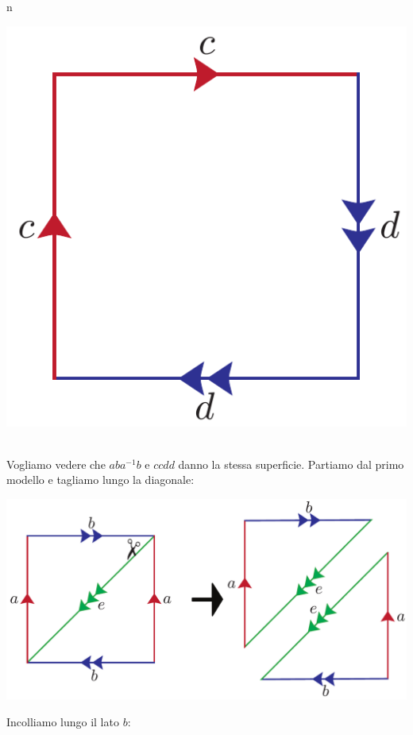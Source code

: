 \begin{remark}{n}
\begin{minipage}{.24\linewidth}
\begin{center}
		\includegraphics[trim=0cm 0cm 0cm 0cm, clip, scale=0.3]{images/projdouble.pdf}
	\end{center}
\end{minipage}\\
Vogliamo vedere che $aba^{-1}b$ e $ccdd$ danno la stessa superficie. Partiamo dal primo modello e tagliamo lungo la diagonale:
\begin{center}
	\includegraphics[trim=0cm 0cm 0cm 0cm, clip, scale=0.3]{images/kleintoprojdouble1.pdf}
\end{center}
Incolliamo lungo il lato $b$:
\begin{center}

\end{center}
\end{remark}
